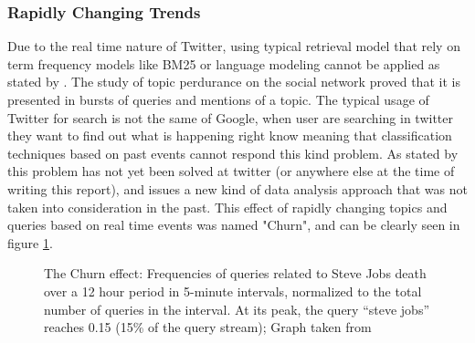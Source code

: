 \subsubsection{Rapidly Changing Trends} %
\label{ssub:real_time_}
Due to the real time nature of Twitter, using typical retrieval model that rely on term frequency models like BM25 or language modeling cannot be applied as stated by \citet{Lin2012}. The study of topic perdurance on the social network proved that it is presented in bursts of queries and mentions of a topic. The typical usage of Twitter for search is not the same of Google, when user are searching in twitter they want to find out what is happening right know meaning that classification techniques based on past events cannot respond this kind problem. As stated by \citet{Lin2012} this problem has not yet been solved at twitter (or anywhere else at the time of writing this report), and issues a new kind of data analysis approach that was not taken into consideration in the past. 
This effect of rapidly changing topics and queries based on real time events was named "Churn", and can be clearly seen in figure \ref{fig:churn}.

  \begin{figure}[tb]
    \begin{center}
    \noindent{}
    \end{center}
    \caption{The Churn effect: Frequencies of queries related to Steve Jobs death over a 12 hour period in 5-minute intervals, normalized to the total number of queries in the interval. At its peak, the query “steve jobs” reaches 0.15 (15\% of the query stream); Graph taken from \cite{Lin2012}}
    \label{fig:churn}
  \end{figure}

